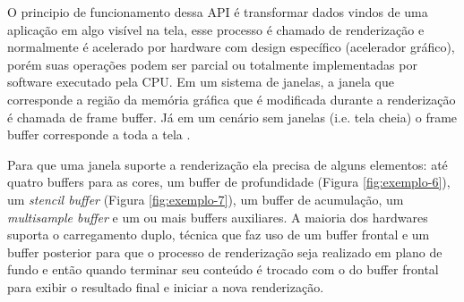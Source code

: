O principio de funcionamento dessa API é transformar dados vindos de uma aplicação em algo visível na tela, esse processo é chamado de renderização e normalmente é acelerado por hardware com design específico (acelerador gráfico), porém suas operações podem ser parcial ou totalmente implementadas por software executado pela CPU. Em um sistema de janelas, a janela que corresponde a região da memória gráfica que é modificada durante a renderização é chamada de frame buffer. Já em um cenário sem janelas (i.e. tela cheia) o frame buffer corresponde a toda a tela \cite{GLSLBook}.

Para que uma janela suporte a renderização ela precisa de alguns elementos: até quatro buffers para as cores, um buffer de profundidade (Figura \ref{fig:exemplo-6}), um \textit{stencil buffer} (Figura \ref{fig:exemplo-7}), um buffer de acumulação, um \textit{multisample buffer} e um ou mais buffers auxiliares. A maioria dos hardwares suporta o carregamento duplo, técnica que faz uso de um buffer frontal e um buffer posterior para que o processo de renderização seja realizado em plano de fundo e então quando terminar seu conteúdo é trocado com o do buffer frontal para exibir o resultado final e iniciar a nova renderização. 

\phantom{a}

\phantom{a}

\begin{figure}[h!]
	\centering
\end{figure}
\nocite{dptbuf}

\begin{figure}[h!]
	\centering
\end{figure}
\nocite{stcbuf}


